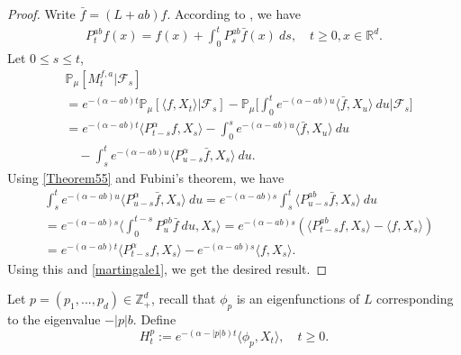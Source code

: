 \documentclass[12pt,a4paper]{amsart}
\theoremstyle{plain}
\theoremstyle{definition}
\numberwithin{equation}{section}
\begin{document}
\begin{proof}
    Write $\bar{f}=(L+ab)f$. According to \cite[Theorem A.55]{Li2011Measure-valued}, we have
\begin{equation}\begin{split}\label{Theorem55}
    P_t^{ab}f(x)= f(x)+\int_0^t P_s^{ab}\bar{f}(x)~ds,\quad t\geq 0,x\in \mathbb R^d.
\end{split}\end{equation}
Let $0\leq s\leq t$,
\begin{equation}\begin{split}
\label{martingale1}
    &\mathbb{P}_{\mu}[M_t^{f,a}|\mathscr{F}_s]
    \\&=e^{-(\alpha-ab)t}\mathbb{P}_{\mu}\left[\langle f,X_t\rangle|\mathscr{F}_s\right]-\mathbb{P}_{\mu}\Big[\int_0^t e^{-(\alpha-ab)u}\langle \bar{f}, X_u\rangle~ du\Big|\mathscr{F}_s\big]
    \\&=e^{-(\alpha-ab)t}\langle P_{t-s}^{\alpha}f, X_s\rangle-\int_0^s e^{-(\alpha-ab)u}\langle \bar{f}, X_u\rangle~ du
    \\&\quad -\int_s^t e^{-(\alpha-ab)u}\langle P_{u-s}^{\alpha} \bar{f},X_s\rangle~ du.
\end{split}\end{equation}
    Using \eqref{Theorem55} and Fubini's theorem, we have
\begin{equation}\begin{split}
    &\int_s^t e^{-(\alpha-ab)u}\langle P_{u-s}^{\alpha} \bar{f},X_s\rangle~ du=e^{-(\alpha-ab)s}\int_s^t\langle P_{u-s}^{ab}\bar{f},X_s\rangle~du\\
    &=e^{-(\alpha-ab)s}\Big\langle\int_0^{t-s}P_{u}^{ab}\bar{f}~du,X_s\Big\rangle=e^{-(\alpha-ab)s}\left(\langle P_{t-s}^{ab}f,X_s\rangle-\langle
    f,X_s\rangle\right)\\
    &=e^{-(\alpha-ab)t}\langle P_{t-s}^{\alpha}f, X_s\rangle-e^{-(\alpha-ab)s}\langle
    f,X_s\rangle.
\end{split}\end{equation}
   Using this and \eqref{martingale1}, we get the desired result.
\end{proof}

    Let $p=(p_1,...,p_d)\in \mathbb Z_+^d$, recall that $\phi_p$ is an eigenfunctions of $L$ corresponding to the eigenvalue $-|p|b$. Define
\[
    H_t^p
    :=e^{-(\alpha-|p|b)t}\langle\phi_p,X_t\rangle, \quad t\geq 0.
\]
\end{document}
